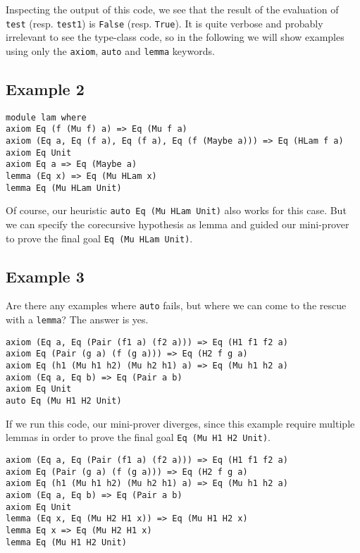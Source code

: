 \documentclass{llncs}
\begin{document}
Inspecting the output of this code, we see that the result of the evaluation of 
\texttt{test} (resp. \texttt{test1}) is \texttt{False} (resp. \texttt{True}). It is quite
verbose and probably irrelevant to see the type-class code, so in the following
we will show examples using only the \texttt{axiom}, \texttt{auto} and \texttt{lemma} keywords.

\subsection{Example 2}

\begin{verbatim}
module lam where
axiom Eq (f (Mu f) a) => Eq (Mu f a)
axiom (Eq a, Eq (f a), Eq (f a), Eq (f (Maybe a))) => Eq (HLam f a)
axiom Eq Unit
axiom Eq a => Eq (Maybe a)
lemma (Eq x) => Eq (Mu HLam x)
lemma Eq (Mu HLam Unit)
\end{verbatim}

Of course, our heuristic \texttt{auto Eq (Mu HLam Unit)} also works for this case. But
we can specify the corecursive hypothesis as lemma and guided our mini-prover to prove the 
final goal \texttt{Eq (Mu HLam Unit)}.

\subsection{Example 3}
Are there any examples where \texttt{auto} fails, but where we can come to the rescue with a \texttt{lemma}? 
The answer is yes. 

\begin{verbatim}
axiom (Eq a, Eq (Pair (f1 a) (f2 a))) => Eq (H1 f1 f2 a)
axiom Eq (Pair (g a) (f (g a))) => Eq (H2 f g a)
axiom Eq (h1 (Mu h1 h2) (Mu h2 h1) a) => Eq (Mu h1 h2 a)
axiom (Eq a, Eq b) => Eq (Pair a b)
axiom Eq Unit
auto Eq (Mu H1 H2 Unit)
\end{verbatim}
If we run this code, our mini-prover diverges, since this example require multiple lemmas
in order to prove the final goal \texttt{Eq (Mu H1 H2 Unit)}. 

\begin{verbatim}
axiom (Eq a, Eq (Pair (f1 a) (f2 a))) => Eq (H1 f1 f2 a)
axiom Eq (Pair (g a) (f (g a))) => Eq (H2 f g a)
axiom Eq (h1 (Mu h1 h2) (Mu h2 h1) a) => Eq (Mu h1 h2 a)
axiom (Eq a, Eq b) => Eq (Pair a b)
axiom Eq Unit
lemma (Eq x, Eq (Mu H2 H1 x)) => Eq (Mu H1 H2 x)
lemma Eq x => Eq (Mu H2 H1 x)
lemma Eq (Mu H1 H2 Unit)
\end{verbatim}
\end{document}
